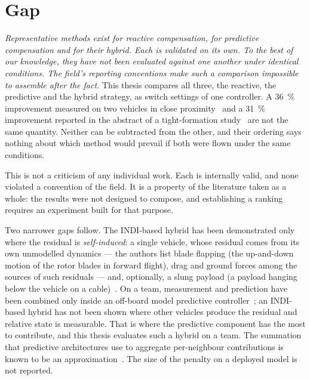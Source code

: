 \section{Gap}
\label{sec:intro-gap}

\emph{Representative methods exist for reactive compensation, for predictive compensation and for
their hybrid. Each is validated on its own. To the best of our knowledge, they have not been
evaluated against one another under identical conditions. The field's reporting conventions make
such a comparison impossible to assemble after the fact.} This thesis compares all three, the
reactive, the predictive and the hybrid strategy, as switch settings of one controller. A
\SI{36}{\percent} improvement measured on two vehicles in close
proximity~\cite{smith2023so2equivariant} and a \SI{31}{\percent} improvement reported in the
abstract of a tight-formation study~\cite{hsieh2026flatness} are not the same quantity. Neither can
be subtracted from the other, and their ordering says nothing about which method would prevail if
both were flown under the same conditions.

This is not a criticism of any individual work. Each is internally valid, and none violated a
convention of the field. It is a property of the literature taken as a whole: the results were not
designed to compose, and establishing a ranking requires an experiment built for that purpose.

Two narrower gaps follow. The INDI-based hybrid has been demonstrated only where the residual is
\emph{self-induced}: a single vehicle, whose residual comes from its own unmodelled dynamics --- the
authors list blade flapping (the up-and-down motion of the rotor blades in forward flight), drag and
ground forces among the sources of such residuals --- and, optionally, a
slung payload (a payload hanging below the vehicle on a cable)~\cite{cobobriesewitz2026lindi}. On a
team, measurement and prediction have been combined only inside an off-board model predictive
controller~\cite{hsieh2025onlineadaptation}; an INDI-based hybrid has not been shown where other
vehicles produce the residual and relative state
is measurable. That is where the predictive component has the most to contribute, and this thesis
evaluates such a hybrid on a team. The summation
that predictive architectures use
to aggregate per-neighbour contributions is known to be an
approximation~\cite{shi2020neuralswarm,gielis2023aggregate}. The size of the penalty on a deployed
model is not reported.

